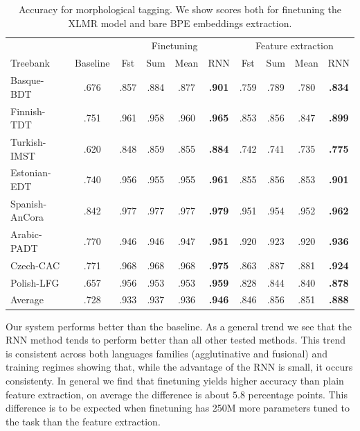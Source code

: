 \documentclass[11pt]{article}
\begin{document}
    \begin{table}%
	\centering
	\begin{tabular}{l|c|cccc|cccc}
		& & \multicolumn{4}{c}{Finetuning} & \multicolumn{4}{c}{Feature extraction} \\
		Treebank & Baseline & Fst & Sum & Mean & RNN & Fst & Sum & Mean & RNN \\
		\hline
		Basque-BDT      & .676 & .857 & .884 & .877 & \textbf{.901} & .759 & .789 & .780 & \textbf{.834} \\
		Finnish-TDT     & .751 & .961 & .958 & .960 & \textbf{.965} & .853 & .856 & .847 & \textbf{.899} \\
		Turkish-IMST    & .620 & .848 & .859 & .855 & \textbf{.884} & .742 & .741 & .735 & \textbf{.775} \\
		Estonian-EDT    & .740 & .956 & .955 & .955 & \textbf{.961} & .855 & .856 & .853 & \textbf{.901} \\
		Spanish-AnCora  & .842 & .977 & .977 & .977 & \textbf{.979} & .951 & .954 & .952 & \textbf{.962} \\
		Arabic-PADT     & .770 & .946 & .946 & .947 & \textbf{.951} & .920 & .923 & .920 & \textbf{.936} \\
		Czech-CAC       & .771 & .968 & .968 & .968 & \textbf{.975} & .863 & .887 & .881 & \textbf{.924} \\
		Polish-LFG      & .657 & .956 & .953 & .953 & \textbf{.959} & .828 & .844 & .840 & \textbf{.878} \\
        \hline
        Average         & .728 & .933 & .937 & .936 & \textbf{.946} & .846 & .856 & .851 & \textbf{.888} \\
	\end{tabular}
    	\caption{\label{tab:results_tokens} Accuracy for morphological
          tagging. We show scores both for finetuning the XLMR model and
          bare BPE embeddings extraction.}
    \end{table}


                Our system performs better than the baseline. As a
     general trend we see that the RNN method tends to perform better
     than all other tested methods. This trend is consistent across
     both languages families (agglutinative and fusional) and
     training regimes showing that, while the advantage of the RNN is
     small, it occurs consistenty.
        In general we find that finetuning yields higher accuracy than
        plain feature extraction, on average the difference is about $5.8$
        percentage points.  This difference is to be expected when
        finetuning has 250M more parameters tuned to the task than the
        feature extraction. %
    
\end{document}

